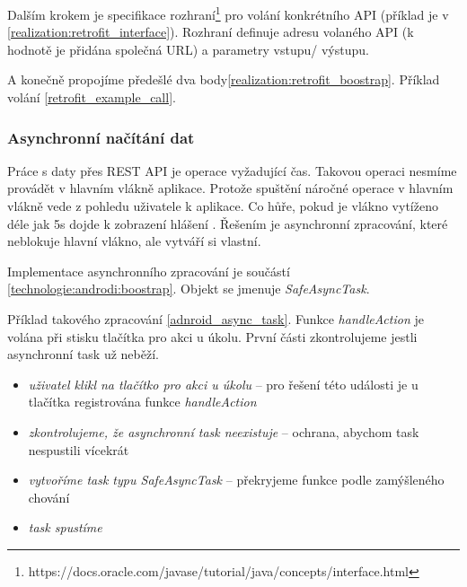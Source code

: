 \documentclass[thesis=B,czech]{FITthesis}[2012/06/26]
\begin{document}
Dalším krokem je specifikace rozhraní\footnote{https://docs.oracle.com/javase/tutorial/java/concepts/interface.html} pro volání konkrétního API (příklad je v \ref{realization:retrofit_interface}). Rozhraní definuje adresu volaného API (k hodnotě je přidána společná URL) a parametry vstupu/ výstupu.



A konečně propojíme předešlé dva body\ref{realization:retrofit_boostrap}. Příklad volání \ref{retrofit_example_call}.





\subsubsection{Asynchronní načítání dat}

Práce s daty přes REST API je operace vyžadující čas. Takovou operaci nesmíme provádět v hlavním vlákně aplikace\cite{android_threads}. Protože spuštění náročné operace v hlavním vlákně vede z pohledu uživatele k  aplikace. Co hůře, pokud je vlákno vytíženo déle jak 5s dojde k zobrazení hlášení . Řešením je asynchronní zpracování, které neblokuje hlavní vlákno, ale vytváří si vlastní.

Implementace asynchronního zpracování je součástí \ref{technologie:androdi:boostrap}. Objekt se jmenuje \textit{SafeAsyncTask}.

Příklad takového zpracování \ref{adnroid_async_task}. Funkce \textit{handleAction} je volána při stisku tlačítka pro akci u úkolu. První části zkontrolujeme jestli asynchronní task už neběží. 
\begin{itemize}[nosep]
	\item \textit{uživatel klikl na tlačítko pro akci u úkolu} -- pro řešení této události je u tlačítka registrována funkce \textit{handleAction} 
	\item \textit{zkontrolujeme, že asynchronní task neexistuje} -- ochrana, abychom task nespustili vícekrát
	\item \textit{vytvoříme task typu SafeAsyncTask} -- překryjeme funkce podle zamýšleného chování
	\item \textit{task spustíme}
\end{itemize}
\end{document}
